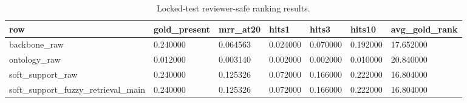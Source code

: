 \begin{table}[t]
\centering
\small
\begin{tabular}{lllllll}
\hline
row & gold\_present & mrr\_at20 & hits1 & hits3 & hits10 & avg\_gold\_rank \\
\hline
backbone\_raw & 0.240000 & 0.064563 & 0.024000 & 0.070000 & 0.192000 & 17.652000 \\
ontology\_raw & 0.012000 & 0.003140 & 0.002000 & 0.002000 & 0.010000 & 20.840000 \\
soft\_support\_raw & 0.240000 & 0.125326 & 0.072000 & 0.166000 & 0.222000 & 16.804000 \\
soft\_support\_fuzzy\_retrieval\_main & 0.240000 & 0.125326 & 0.072000 & 0.166000 & 0.222000 & 16.804000 \\
\hline
\end{tabular}
\caption{Locked-test reviewer-safe ranking results.}
\label{tab:locked-test-ranking}
\end{table}
